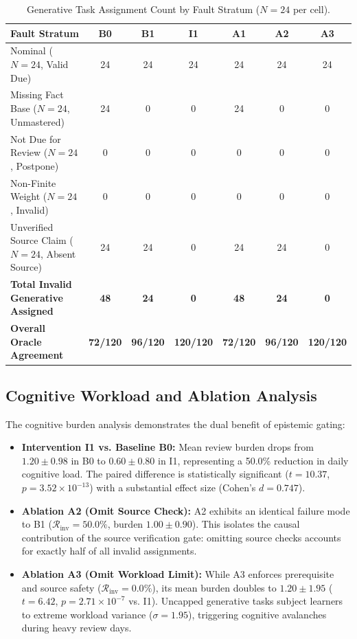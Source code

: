 \documentclass[11pt,a4paper]{article}
\begin{document}
\begin{table}[htbp]
\centering
\small
\caption{Generative Task Assignment Count by Fault Stratum ($N=24$ per cell).}
\label{tab:strata-breakdown}
\begin{tabular}{lcccccc}
\toprule
Fault Stratum & B0 & B1 & I1 & A1 & A2 & A3 \\
\midrule
Nominal ($N=24$, Valid Due) & 24 & 24 & 24 & 24 & 24 & 24 \\
Missing Fact Base ($N=24$, Unmastered) & 24 & 0 & 0 & 24 & 0 & 0 \\
Not Due for Review ($N=24$, Postpone) & 0 & 0 & 0 & 0 & 0 & 0 \\
Non-Finite Weight ($N=24$, Invalid) & 0 & 0 & 0 & 0 & 0 & 0 \\
Unverified Source Claim ($N=24$, Absent Source) & 24 & 24 & 0 & 24 & 24 & 0 \\
\midrule
\textbf{Total Invalid Generative Assigned} & \textbf{48} & \textbf{24} & \textbf{0} & \textbf{48} & \textbf{24} & \textbf{0} \\
\textbf{Overall Oracle Agreement} & \textbf{72/120} & \textbf{96/120} & \textbf{120/120} & \textbf{72/120} & \textbf{96/120} & \textbf{120/120} \\
\bottomrule
\end{tabular}
\end{table}

\subsection{Cognitive Workload and Ablation Analysis}
The cognitive burden analysis demonstrates the dual benefit of epistemic gating:
\begin{itemize}[leftmargin=*]
    \item \textbf{Intervention I1 vs. Baseline B0:} Mean review burden drops from $1.20 \pm 0.98$ in B0 to $0.60 \pm 0.80$ in I1, representing a 50.0\% reduction in daily cognitive load. The paired difference is statistically significant ($t = 10.37$, $p = 3.52 \times 10^{-13}$) with a substantial effect size (Cohen's $d = 0.747$).
    \item \textbf{Ablation A2 (Omit Source Check):} A2 exhibits an identical failure mode to B1 ($\mathcal{R}_{\text{inv}} = 50.0\%$, burden $1.00 \pm 0.90$). This isolates the causal contribution of the source verification gate: omitting source checks accounts for exactly half of all invalid assignments.
    \item \textbf{Ablation A3 (Omit Workload Limit):} While A3 enforces prerequisite and source safety ($\mathcal{R}_{\text{inv}} = 0.0\%$), its mean burden doubles to $1.20 \pm 1.95$ ($t = 6.42$, $p = 2.71 \times 10^{-7}$ vs. I1). Uncapped generative tasks subject learners to extreme workload variance ($\sigma = 1.95$), triggering cognitive avalanches during heavy review days.
\end{itemize}
\end{document}
